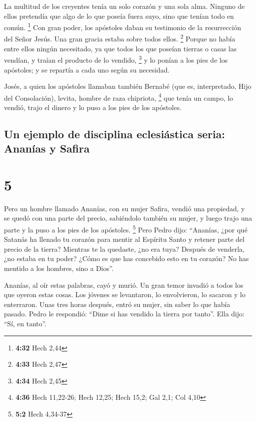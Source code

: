  La multitud de los creyentes tenía un solo corazón y una
sola alma. Ninguno de ellos pretendía que algo de lo que poseía fuera
suyo, sino que tenían todo en común. \footnote{\textbf{4:32} Hech 2,44}
 Con gran poder, los apóstoles daban su testimonio de la
resurrección del Señor Jesús. Una gran gracia estaba sobre todos ellos.
\footnote{\textbf{4:33} Hech 2,47}  Porque no había entre
ellos ningún necesitado, ya que todos los que poseían tierras o casas
las vendían, y traían el producto de lo vendido, \footnote{\textbf{4:34}
  Hech 2,45}  y lo ponían a los pies de los apóstoles; y
se repartía a cada uno según su necesidad.

 Josés, a quien los apóstoles llamaban también Bernabé
(que es, interpretado, Hijo del Consolación), levita, hombre de raza
chipriota, \footnote{\textbf{4:36} Hech 11,22-26; Hech 12,25; Hech 15,2;
  Gal 2,1; Col 4,10}  que tenía un campo, lo vendió,
trajo el dinero y lo puso a los pies de los apóstoles.

\hypertarget{un-ejemplo-de-disciplina-eclesiuxe1stica-seria-ananuxedas-y-safira}{%
\subsection{Un ejemplo de disciplina eclesiástica seria: Ananías y
Safira}\label{un-ejemplo-de-disciplina-eclesiuxe1stica-seria-ananuxedas-y-safira}}

\hypertarget{section-4}{%
\section{5}\label{section-4}}

 Pero un hombre llamado Ananías, con su mujer Safira,
vendió una propiedad,  y se quedó con una parte del
precio, sabiéndolo también su mujer, y luego trajo una parte y la puso a
los pies de los apóstoles. \footnote{\textbf{5:2} Hech 4,34-37}
 Pero Pedro dijo: ``Ananías, ¿por qué Satanás ha llenado
tu corazón para mentir al Espíritu Santo y retener parte del precio de
la tierra?  Mientras te la quedaste, ¿no era tuya? Después
de venderla, ¿no estaba en tu poder? ¿Cómo es que has concebido esto en
tu corazón? No has mentido a los hombres, sino a Dios''.

 Ananías, al oír estas palabras, cayó y murió. Un gran
temor invadió a todos los que oyeron estas cosas.  Los
jóvenes se levantaron, lo envolvieron, lo sacaron y lo enterraron.
 Unas tres horas después, entró su mujer, sin saber lo que
había pasado.  Pedro le respondió: ``Dime si has vendido
la tierra por tanto''. Ella dijo: ``Sí, en tanto''.

